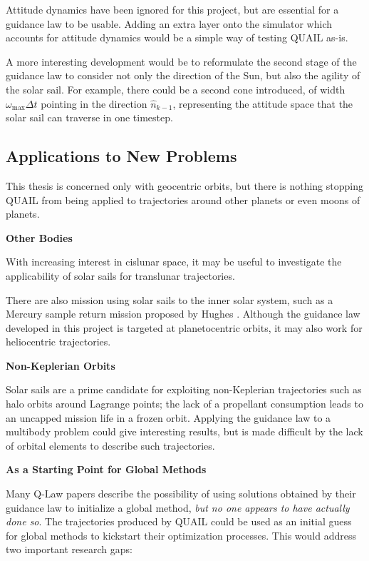 Attitude dynamics have been ignored for this project, but are essential for a guidance law to be usable. Adding an extra layer onto the simulator which accounts for attitude dynamics would be a simple way of testing QUAIL as-is.

A more interesting development would be to reformulate the second stage of the guidance law to consider not only the direction of the Sun, but also the agility of the solar sail. For example, there could be a second cone introduced, of width \(\omega_{\text{max}} \Delta t\) pointing in the direction \(\hat{n}_{k-1}\), representing the attitude space that the solar sail can traverse in one timestep.


\subsection{Applications to New Problems}
This thesis is concerned only with geocentric orbits, but there is nothing stopping QUAIL from being applied to trajectories around other planets or even moons of planets.

\textbf{Other Bodies}

With increasing interest in cislunar space, it may be useful to investigate the applicability of solar sails for translunar trajectories.

There are also mission using solar sails to the inner solar system, such as a Mercury sample return mission proposed by Hughes \cite{hughes2006sample}. Although the guidance law developed in this project is targeted at planetocentric orbits, it may also work for heliocentric trajectories.

\textbf{Non-Keplerian Orbits}

Solar sails are a prime candidate for exploiting non-Keplerian trajectories such as halo orbits around Lagrange points; the lack of a propellant consumption leads to an uncapped mission life in a frozen orbit. Applying the guidance law to a multibody problem could give interesting results, but is made difficult by the lack of orbital elements to describe such trajectories.

\textbf{As a Starting Point for Global Methods}

Many Q-Law papers describe the possibility of using solutions obtained by their guidance law to initialize a global method, \textit{but no one appears to have actually done so}. The trajectories produced by QUAIL could be used as an initial guess for global methods to kickstart their optimization processes. This would address two important research gaps:


